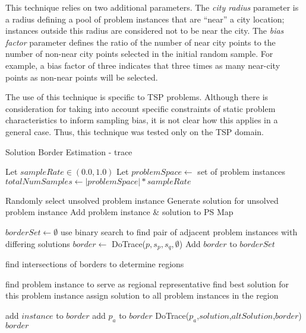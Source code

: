 This technique relies on two additional parameters.  The \textit{city radius} parameter is a radius defining a pool of problem instances that are ``near'' a city location; instances outside this radius are considered not to be near the city.  The \textit{bias factor} parameter defines the ratio of the number of near city points to the number of non-near city points selected in the initial random sample.  For example, a bias factor of three indicates that three times as many near-city points as non-near points will be selected.

The use of this technique is specific to TSP problems.  Although there is consideration for taking into account specific constraints of static problem characteristics to inform sampling bias, it is not clear how this applies in a general case.  Thus, this technique was tested only on the TSP domain.

\begin{algorithm}
\caption{Solution Border Estimation - trace}   
\label{alg:sbe}
\small
\begin{algorithmic}[1] 
  \State Let $sampleRate \in (0.0,1.0)$
  \State Let $problemSpace \leftarrow$ set of problem instances
  \State $totalNumSamples \leftarrow |problemSpace| * sampleRate$

   \label{alg:sbe:initsample}
    \State Randomly select unsolved problem instance
    \State Generate solution for unsolved problem instance
    \State Add problem instance \& solution to PS Map
  \EndFor

  \State $borderSet \leftarrow \emptyset$
   \label{alg:sbe:binarysearch}
    \State use binary search to find pair of adjacent problem instances with differing solutions \label{alg:sbe:dobinarysearch}
    \State $border \leftarrow$ DoTrace($p,s_p,s_q,\emptyset$)
    \State Add $border$ to $borderSet$
  \EndFor

  \State find intersections of borders to determine regions \label{alg:sbe:findintersections}

   \label{alg:sbe:regions}
    \State find problem instance to serve as regional representative
    \State find best solution for this problem instance
    \State assign solution to all problem instances in the region
  \EndFor

    \State add $instance$ to $border$
        \State add $p_a$ to $border$
        \State DoTrace($p_a$,$solution$,$altSolution$,$border$)
      \EndIf
    \EndFor
    \State \Return $border$
  \EndFunction
      

\end{algorithmic}
\end{algorithm}


